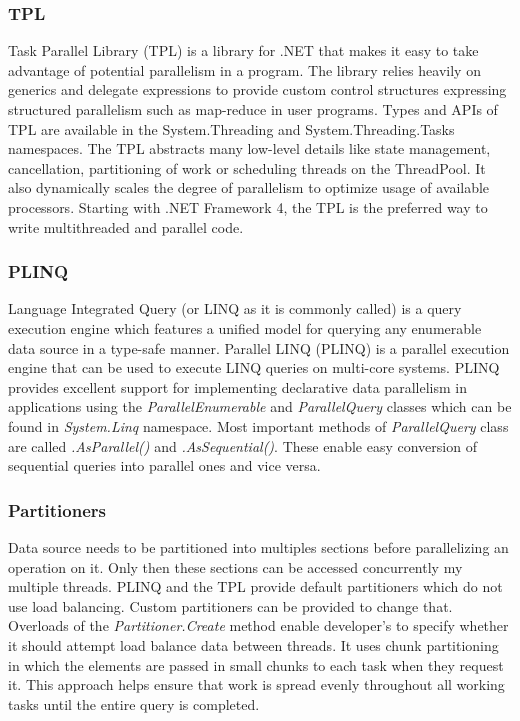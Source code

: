 \subsubsection{TPL}
Task Parallel Library (TPL) is a library for .NET that
makes it easy to take advantage of potential parallelism in
a program. The library relies heavily on generics and delegate
expressions to provide custom control structures expressing
structured parallelism such as map-reduce in user
programs. Types and APIs of TPL are available in the System.Threading and System.Threading.Tasks namespaces.
The TPL abstracts many low-level details like state management, cancellation, partitioning of work or scheduling threads on the ThreadPool.
It also dynamically scales the degree of parallelism to optimize usage of available processors. Starting with .NET Framework 4, the TPL is the preferred way to write multithreaded and parallel code. \cite{Leijen2009}

\subsubsection{PLINQ}
Language Integrated Query (or LINQ as it is commonly called) is a query execution engine which features a unified model for querying any enumerable data source in a type-safe manner. Parallel LINQ (PLINQ) is a parallel execution engine that can be used to execute LINQ queries on multi-core systems. PLINQ provides excellent support for implementing declarative data parallelism in applications using the \emph{ParallelEnumerable} and \emph{ParallelQuery} classes which can be found in \emph{System.Linq} namespace.
Most important methods of \emph{ParallelQuery} class are called \emph{.AsParallel()} and \emph{.AsSequential()}. These enable easy conversion of sequential queries into parallel ones and vice versa.

\subsubsection{Partitioners}
Data source needs to be partitioned into multiples sections before parallelizing an operation on it. Only then these sections can be accessed concurrently my multiple threads. PLINQ and the TPL provide default partitioners which do not use load balancing. Custom partitioners can be provided to change that. Overloads of the \emph{Partitioner.Create} method
 enable developer's to specify whether it should attempt load balance data between threads. It uses chunk partitioning in which the elements are passed in small chunks to each task when they request it. This approach helps ensure that work is spread evenly throughout all working tasks until the entire query is completed. \cite{Partitioners}

